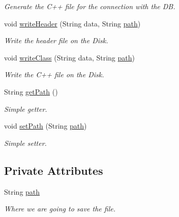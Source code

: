 \begin{DoxyCompactItemize}
\begin{DoxyCompactList}\small\item\em Generate the C++ file for the connection with the DB. \end{DoxyCompactList}\item 
void \hyperlink{class_classes_c_p_p_1_1_connection_a09fb77eb74ce9dab17b70f1f2f0b778d}{writeHeader} (String data, String \hyperlink{class_classes_c_p_p_1_1_connection_a36009c576cf538cfc00828ff5fdb079e}{path})
\begin{DoxyCompactList}\small\item\em Write the header file on the Disk. \end{DoxyCompactList}\item 
void \hyperlink{class_classes_c_p_p_1_1_connection_ad919fad2418beb85653bd1936b299e29}{writeClass} (String data, String \hyperlink{class_classes_c_p_p_1_1_connection_a36009c576cf538cfc00828ff5fdb079e}{path})
\begin{DoxyCompactList}\small\item\em Write the C++ file on the Disk. \end{DoxyCompactList}\item 
String \hyperlink{class_classes_c_p_p_1_1_connection_a61622ff788e8cb6f51002ef2e7f185d0}{getPath} ()
\begin{DoxyCompactList}\small\item\em Simple getter. \end{DoxyCompactList}\item 
void \hyperlink{class_classes_c_p_p_1_1_connection_a8d3c08fea3f44d3c4fdebe36d61f6c26}{setPath} (String \hyperlink{class_classes_c_p_p_1_1_connection_a36009c576cf538cfc00828ff5fdb079e}{path})
\begin{DoxyCompactList}\small\item\em Simple setter. \end{DoxyCompactList}\end{DoxyCompactItemize}
\subsection*{Private Attributes}
\begin{DoxyCompactItemize}
\item 
\hypertarget{class_classes_c_p_p_1_1_connection_a36009c576cf538cfc00828ff5fdb079e}{
String \hyperlink{class_classes_c_p_p_1_1_connection_a36009c576cf538cfc00828ff5fdb079e}{path}}
\label{class_classes_c_p_p_1_1_connection_a36009c576cf538cfc00828ff5fdb079e}

\begin{DoxyCompactList}\small\item\em Where we are going to save the file. \end{DoxyCompactList}\end{DoxyCompactItemize}


